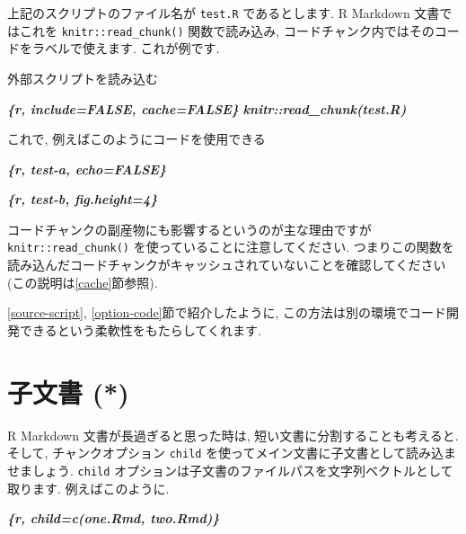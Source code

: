 \documentclass[
  11pt,
  lualatex,
  ja=standard]{bxjsreport}
\newenvironment{Shaded}{\begin{snugshade}}{\end{snugshade}}
\newcommand{\InformationTok}[1]{\textcolor[rgb]{0.56,0.35,0.01}{\textbf{\textit{#1}}}}
\newcommand{\NormalTok}[1]{#1}
\begin{document}
上記のスクリプトのファイル名が \texttt{test.R} であるとします. R Markdown 文書ではこれを \texttt{knitr::read\_chunk()} 関数で読み込み, コードチャンク内ではそのコードをラベルで使えます. これが例です.

\begin{Shaded}
\begin{Highlighting}[]
\NormalTok{外部スクリプトを読み込む}

\InformationTok{\textasciigrave{}\textasciigrave{}\textasciigrave{}\{r, include=FALSE, cache=FALSE\}}
\InformationTok{knitr::read\_chunk(\textquotesingle{}test.R\textquotesingle{})}
\InformationTok{\textasciigrave{}\textasciigrave{}\textasciigrave{}}

\NormalTok{これで, 例えばこのようにコードを使用できる}

\InformationTok{\textasciigrave{}\textasciigrave{}\textasciigrave{}\{r, test{-}a, echo=FALSE\}}
\InformationTok{\textasciigrave{}\textasciigrave{}\textasciigrave{}}

\InformationTok{\textasciigrave{}\textasciigrave{}\textasciigrave{}\{r, test{-}b, fig.height=4\}}
\InformationTok{\textasciigrave{}\textasciigrave{}\textasciigrave{}}
\end{Highlighting}
\end{Shaded}

コードチャンクの副産物にも影響するというのが主な理由ですが \texttt{knitr::read\_chunk()} を使っていることに注意してください. つまりこの関数を読み込んだコードチャンクがキャッシュされていないことを確認してください (この説明は\ref{cache}節参照).

\ref{source-script}, \ref{option-code}節で紹介したように, この方法は別の環境でコード開発できるという柔軟性をもたらしてくれます.

\hypertarget{child-document}{%
\section{子文書 (*)}\label{child-document}}

R Markdown 文書が長過ぎると思った時は, 短い文書に分割することも考えると. そして, チャンクオプション \texttt{child} を使ってメイン文書に子文書として読み込ませましょう. \texttt{child} オプションは子文書のファイルパスを文字列ベクトルとして取ります. 例えばこのように.

\begin{Shaded}
\begin{Highlighting}[]
\InformationTok{\textasciigrave{}\textasciigrave{}\textasciigrave{}\{r, child=c(\textquotesingle{}one.Rmd\textquotesingle{}, \textquotesingle{}two.Rmd\textquotesingle{})\}}
\InformationTok{\textasciigrave{}\textasciigrave{}\textasciigrave{}}
\end{Highlighting}
\end{Shaded}
\end{document}
